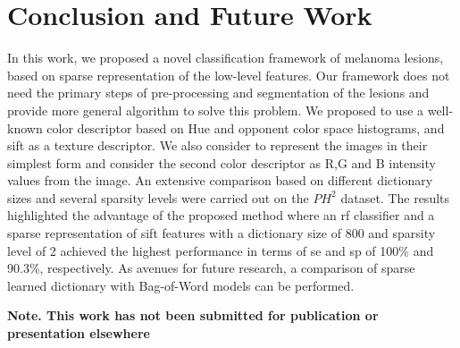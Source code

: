 \section{Conclusion and Future Work}
\label{sec:con}
In this work, we proposed a novel classification framework of melanoma lesions, based on sparse representation of the low-level features. 
Our framework does not need the primary steps of pre-processing and segmentation of the lesions and provide more general algorithm to solve this problem. 
We proposed to use a well-known color descriptor based on Hue and opponent color space histograms, and \ac{sift} as a texture descriptor. 
We also consider to represent the images in their simplest form and consider the second color descriptor as R,G and B intensity values from the image.
An extensive comparison based on different dictionary sizes and several sparsity levels were carried out on the $PH^{2}$ dataset. 
The results highlighted the advantage of the proposed method where an \ac{rf} classifier and a sparse representation of \ac{sift} features with a dictionary size of 800 and sparsity level of 2 achieved the highest performance in terms of \ac{se} and \ac{sp} of 100\% and 90.3\%, respectively.
As avenues for future research, a comparison of sparse learned dictionary with Bag-of-Word models can be performed.


\textbf{Note. This work has not been submitted for publication or presentation elsewhere}

